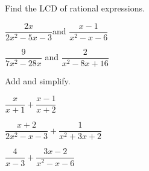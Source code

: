 \vfill
\begin{center} \hfill
\end{center}



\begin{exercise}
	Find the LCD of rational expressions.

	\noindent
	\begin{enumerate*}[label={(\arabic*)~}]
		\item $\dfrac{2x}{2x^2-5x-3}$\quad and \quad $\dfrac{x-1}{x^2-x-6}$
		\item $\dfrac{9}{7x^2-28x}$ \quad and \quad $\dfrac{2}{x^2-8x+16}$
		\hfill\null
	\end{enumerate*}
\end{exercise}

\vfill
\begin{center} \hfill
\end{center}



\newpage

\begin{exercise}
	Add and simplify.

	\noindent
	\begin{enumerate*}[label={(\arabic*)~}]
		\item $\dfrac{x}{x+1}+\dfrac{x-1}{x+2}$
		\item $\dfrac{x+2}{2x^2-x-3}+\dfrac{1}{x^2+3x+2}$
		\item $\dfrac{4}{x-3}+\dfrac{3x-2}{x^2-x-6}$  %
		\hfill\null
	\end{enumerate*}
\end{exercise}

